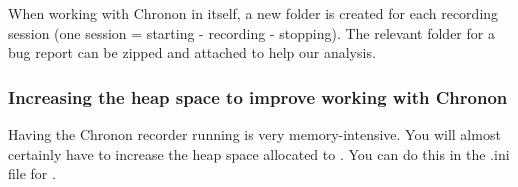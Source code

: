 When working with Chronon in \app{} itself, a new folder is created for each recording session (one session = starting - recording - stopping). The relevant folder for a bug report can be zipped and attached to help our analysis. 


\subsubsection{Increasing the heap space to improve working with Chronon}
Having the Chronon recorder running is very memory-intensive. You will almost certainly have to increase the heap space allocated to \app{}. You can do this in the .ini file for \app{}. 



